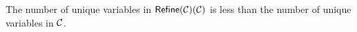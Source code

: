 \documentclass[runningheads]{llncs}
\begin{document}
\begin{lemma}
  \label{lem:refine-decreases}
  The number of unique variables in $\textsf{Refine}(\mathcal{C})(\mathcal{C})$ is less than the number of unique variables in $\mathcal{C}$.
\end{lemma}




\end{document}
